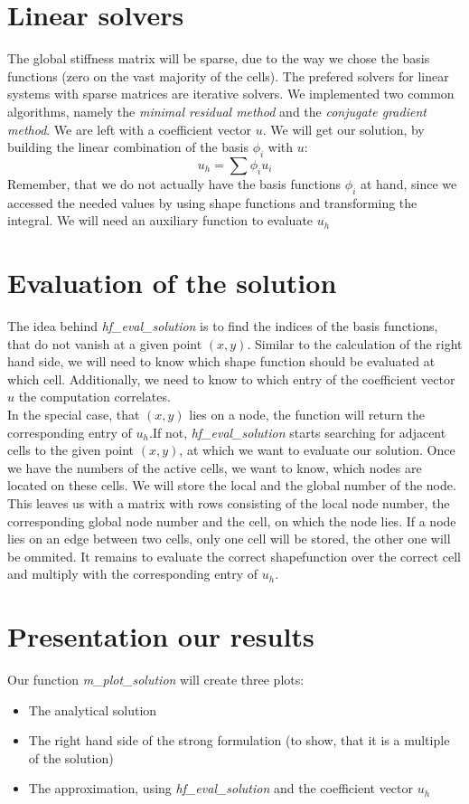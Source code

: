 \section{Linear solvers}
The global stiffness matrix will be sparse, due to the way we chose the basis functions (zero on the vast majority of the cells). The prefered solvers for linear systems with sparse matrices are iterative solvers. We implemented two common algorithms, namely the \textit{minimal residual method} and the \textit{conjugate gradient method}. 
We are left with a coefficient vector $u$. We will get our solution, by building the linear combination of the basis ${\phi_i}$ with $u$: 
\[u_h = \sum \phi_i u_i\]
Remember, that we do not actually have the basis functions $\phi_i$ at hand, since we accessed the needed values by using shape functions and transforming the integral. We will need an auxiliary function to evaluate $u_h$

\section{Evaluation of the solution}
The idea behind \textit{hf\_eval\_solution} is to find the indices of the basis functions, that do not vanish at a given point $(x,y)$. Similar to the calculation of the right hand side, we will need to know which shape function should be evaluated at which cell. Additionally, we need to know to which entry of the coefficient vector $u$ the computation correlates.\\
In the special case, that $(x,y)$ lies on a node, the function will return the corresponding entry of $u_h$.If not, \textit{hf\_eval\_solution} starts searching for adjacent cells to the given point $(x,y)$, at which we want to evaluate our solution. Once we have the numbers of the active cells, we want to know, which nodes are located on these cells. We will store the local and the global number of the node. This leaves us with a matrix with rows consisting of the local node number, the corresponding global node number and the cell, on which the node lies. If a node lies on an edge between two cells, only one cell will be stored, the other one will be ommited. It remains to evaluate the correct shapefunction over the correct cell and multiply with the corresponding entry of $u_h$.

\section{Presentation our results}
Our function \textit{m\_plot\_solution} will create three plots:
\begin{itemize}
\item The analytical solution
\item The right hand side of the strong formulation (to show, that it is a multiple of the solution)
\item The approximation, using \textit{hf\_eval\_solution} and the coefficient vector $u_h$
\end{itemize}

